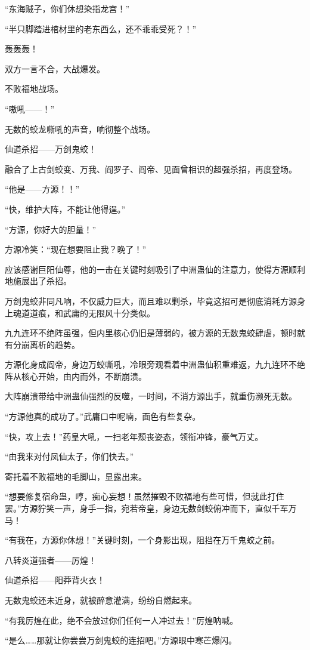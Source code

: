 \begin{this_body}
“东海贼子，你们休想染指龙宫！”

“半只脚踏进棺材里的老东西么，还不乖乖受死？！”

轰轰轰！

双方一言不合，大战爆发。

不败福地战场。

“嗷吼——！”

无数的蛟龙嘶吼的声音，响彻整个战场。

仙道杀招——万剑鬼蛟！

融合了上古剑蛟变、万我、阎罗子、阎帝、见面曾相识的超强杀招，再度登场。

“他是——方源！！”

“快，维护大阵，不能让他得逞。”

“方源，你好大的胆量！”

方源冷笑：“现在想要阻止我？晚了！”

应该感谢巨阳仙尊，他的一击在关键时刻吸引了中洲蛊仙的注意力，使得方源顺利地施展出了杀招。

万剑鬼蛟非同凡响，不仅威力巨大，而且难以剿杀，毕竟这招可是彻底消耗方源身上魂道道痕，和武庸的无限风十分类似。

九九连环不绝阵虽强，但内里核心仍旧是薄弱的，被方源的无数鬼蛟肆虐，顿时就有分崩离析的趋势。

方源化身成阎帝，身边万蛟嘶吼，冷眼旁观看着中洲蛊仙积重难返，九九连环不绝阵从核心开始，由内而外，不断崩溃。

大阵崩溃带给中洲蛊仙强烈的反噬，一时间，不消方源出手，就重伤濒死无数。

“方源他真的成功了。”武庸口中呢喃，面色有些复杂。

“快，攻上去！”药皇大吼，一扫老年颓丧姿态，领衔冲锋，豪气万丈。

“由我来对付凤仙太子，你们快去。”

寄托着不败福地的毛脚山，显露出来。

“想要修复宿命蛊，哼，痴心妄想！虽然摧毁不败福地有些可惜，但就此打住罢。”方源狞笑一声，身手一指，宛若帝皇，身边无数剑蛟俯冲而下，直似千军万马！

“有我在，方源你休想！”关键时刻，一个身影出现，阻挡在万千鬼蛟之前。

八转炎道强者——厉煌！

仙道杀招——阳莽背火衣！

无数鬼蛟还未近身，就被醉意灌满，纷纷自燃起来。

“有我厉煌在此，绝不会放过你们任何一人冲过去！”厉煌呐喊。

“是么……那就让你尝尝万剑鬼蛟的连招吧。”方源眼中寒芒爆闪。


\end{this_body}
